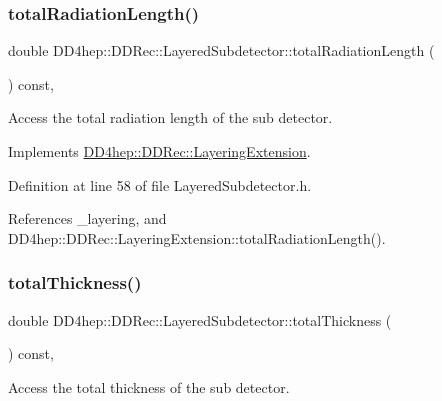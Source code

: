\subsubsection{\texorpdfstring{total\+Radiation\+Length()}{totalRadiationLength()}}
{\footnotesize\ttfamily double D\+D4hep\+::\+D\+D\+Rec\+::\+Layered\+Subdetector\+::total\+Radiation\+Length (\begin{DoxyParamCaption}{ }\end{DoxyParamCaption}) const\hspace{0.3cm}{\ttfamily [inline]}, {\ttfamily [virtual]}}



Access the total radiation length of the sub detector. 



Implements \hyperlink{class_d_d4hep_1_1_d_d_rec_1_1_layering_extension_a710dca345926458ed3ab3abc06490ee9}{D\+D4hep\+::\+D\+D\+Rec\+::\+Layering\+Extension}.



Definition at line 58 of file Layered\+Subdetector.\+h.



References \+\_\+layering, and D\+D4hep\+::\+D\+D\+Rec\+::\+Layering\+Extension\+::total\+Radiation\+Length().

\hypertarget{class_d_d4hep_1_1_d_d_rec_1_1_layered_subdetector_a0a47efb56ee534813273f42808502921}{}\label{class_d_d4hep_1_1_d_d_rec_1_1_layered_subdetector_a0a47efb56ee534813273f42808502921} 
\subsubsection{\texorpdfstring{total\+Thickness()}{totalThickness()}}
{\footnotesize\ttfamily double D\+D4hep\+::\+D\+D\+Rec\+::\+Layered\+Subdetector\+::total\+Thickness (\begin{DoxyParamCaption}{ }\end{DoxyParamCaption}) const\hspace{0.3cm}{\ttfamily [inline]}, {\ttfamily [virtual]}}



Access the total thickness of the sub detector. 



